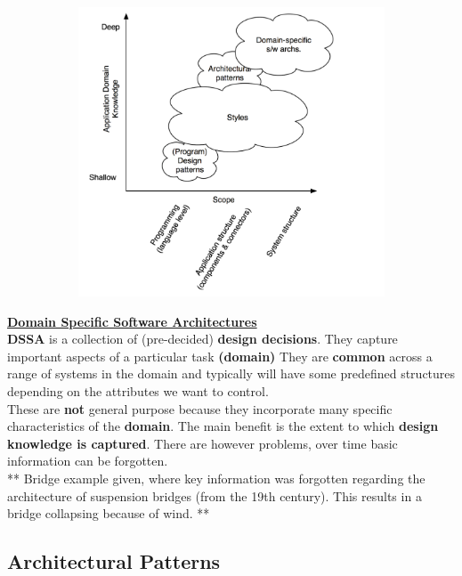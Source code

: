 \documentclass[a4paper]{article}
\begin{document}
\begin{figure}[H]
\hskip-2.5cm\begin{subfigure}{1\textwidth}
  \includegraphics[width=1\linewidth]
  {images/3-graph.png}
\end{subfigure}
\end{figure}

\underline{\textbf{Domain Specific Software Architectures}}\\
\textbf{DSSA} is a collection of (pre-decided) \textbf{design decisions}. They capture important aspects of a particular task \textbf{(domain)} They are \textbf{common} across a range of systems in the domain and typically will have some predefined structures depending on the attributes we want to control.\\

These are \textbf{not} general purpose because they incorporate many specific characteristics of the \textbf{domain}. The main benefit is the extent to which \textbf{design knowledge is captured}. There are however problems, over time basic information can be forgotten.\\

** Bridge example given, where key information was forgotten regarding the architecture of suspension bridges (from the 19th century). This results in a bridge collapsing because of wind. **
\subsection{Architectural Patterns}
\end{document}

